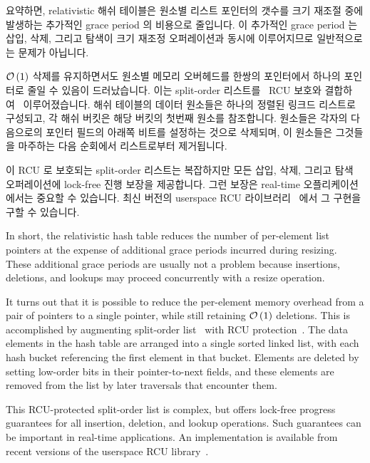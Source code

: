 \fi

요약하면, relativistic 해쉬 테이블은 원소별 리스트 포인터의 갯수를 크기 재조절
중에 발생하는 추가적인 grace period 의 비용으로 줄입니다.
이 추가적인 grace period 는 삽입, 삭제, 그리고 탐색이 크기 재조정 오퍼레이션과
동시에 이루어지므로 일반적으로는 문제가 아닙니다.

$\mathcal{O}\left(1\right)$ 삭제를 유지하면서도 원소별 메모리 오버헤드를 한쌍의 포인터에서 하나의
포인터로 줄일 수 있음이 드러났습니다.
이는 split-order 리스트를~\cite{OriShalev2006SplitOrderListHash} RCU 보호와
결합하여~\cite{MathieuDesnoyers2009URCU,PaulMcKenney2013LWNURCUhash}
이루어졌습니다.
해쉬 테이블의 데이터 원소들은 하나의 정렬된 링크드 리스트로 구성되고, 각 해쉬
버킷은 해당 버킷의 첫번째 원소를 참조합니다.
원소들은 각자의 다음으로의 포인터 필드의 아래쪽 비트를 설정하는 것으로
삭제되며, 이 원소들은 그것들을 마주하는 다음 순회에서 리스트로부터 제거됩니다.

이 RCU 로 보호되는 split-order 리스트는 복잡하지만 모든 삽입, 삭제, 그리고 탐색
오퍼레이션에 lock-free 진행 보장을 제공합니다.
그런 보장은 real-time 오플리케이션에서는 중요할 수 있습니다.
최신 버전의 userspace RCU 라이브러리~\cite{MathieuDesnoyers2009URCU} 에서 그
구현을 구할 수 있습니다.

\iffalse

In short, the relativistic hash table reduces the number of per-element
list pointers at the expense of additional grace periods incurred during
resizing.
These additional grace periods are usually not a problem because
insertions, deletions, and lookups may proceed concurrently with
a resize operation.

It turns out that it is possible to reduce the per-element memory overhead
from a pair of pointers to a single pointer, while still retaining
$\mathcal{O}\left(1\right)$ deletions.
This is accomplished by augmenting split-order
list~\cite{OriShalev2006SplitOrderListHash}
with RCU
protection~\cite{MathieuDesnoyers2009URCU,PaulMcKenney2013LWNURCUhash}.
The data elements in the hash table are arranged into a single
sorted linked list, with each hash bucket referencing the first element
in that bucket.
Elements are deleted by setting low-order bits in their pointer-to-next
fields, and these elements are removed from the list by later traversals
that encounter them.

This RCU-protected split-order list is complex, but offers lock-free
progress guarantees for all insertion, deletion, and lookup operations.
Such guarantees can be important in real-time applications.
An implementation is available from recent versions of the userspace RCU
library~\cite{MathieuDesnoyers2009URCU}.


